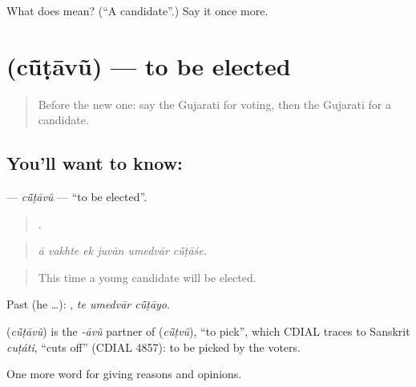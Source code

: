 \begin{tcolorbox}[breakable,colback=teal!4,colframe=teal!35!black,title={Before you move on}]
What does  mean? (\textquotedblleft{}A candidate\textquotedblright{}.) Say it once more.
\end{tcolorbox}
\section[\texorpdfstring{\gu{ચૂંટાવું} (cū̃ṭāvũ)}{ચૂંટાવું (cū̃ṭāvũ)}]{ (cū̃ṭāvũ) — to be elected}

\label{lesson:GU-C353-cutavu}



\begin{quote}
Before the new one: say the Gujarati for voting, then the Gujarati for a candidate.
\end{quote}

\subsection*{You'll want to know: }
\textbf{} — \emph{cū̃ṭāvũ} — \textquotedblleft{}to be elected\textquotedblright{}.

\begin{quote}
     .
\end{quote}

\begin{quote}
\emph{ā vakhte ek juvān umedvār cū̃ṭāśe.}
\end{quote}

\begin{quote}
This time a young candidate will be elected.
\end{quote}

Past (he …):   , \emph{te umedvār cū̃ṭāyo}.

\begin{cousinweb}
\textbf{} (\emph{cū̃ṭāvũ}) is the \emph{-āvũ} partner of \textbf{} (\emph{cū̃ṭvũ}), \textquotedblleft{}to pick\textquotedblright{}, which CDIAL traces to Sanskrit \emph{cuṭáti}, \textquotedblleft{}cuts off\textquotedblright{} (CDIAL 4857): to be picked by the voters.
\end{cousinweb}

\begin{grammarlens}[title={What you've built}]
One more word for giving reasons and opinions.
\end{grammarlens}

